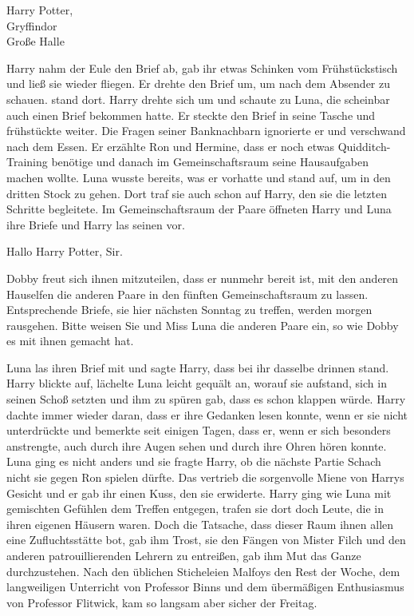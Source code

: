 \begin{brief}
Harry Potter,\\
Gryffindor\\
Große Halle
\end{brief}

Harry nahm der Eule den Brief ab, gab ihr etwas Schinken vom Frühstückstisch und ließ sie wieder fliegen. Er drehte den Brief um, um nach dem Absender zu schauen.  stand dort. Harry drehte sich um und schaute zu Luna, die scheinbar auch einen Brief bekommen hatte. Er steckte den Brief in seine Tasche und frühstückte weiter. Die Fragen seiner Banknachbarn ignorierte er und verschwand nach dem Essen. Er erzählte Ron und Hermine, dass er noch etwas Quidditch-Training benötige und danach im Gemeinschaftsraum seine Hausaufgaben machen wollte. Luna wusste bereits, was er vorhatte und stand auf, um in den dritten Stock zu gehen. Dort traf sie auch schon auf Harry, den sie die letzten Schritte begleitete. Im Gemeinschaftsraum der Paare öffneten Harry und Luna ihre Briefe und Harry las seinen vor.

\begin{brief}
Hallo Harry Potter, Sir.

Dobby freut sich ihnen mitzuteilen, dass er nunmehr bereit ist, mit den anderen Hauselfen die anderen Paare in den fünften Gemeinschaftsraum zu lassen. Entsprechende Briefe, sie hier nächsten Sonntag zu treffen, werden morgen rausgehen. Bitte weisen Sie und Miss Luna die anderen Paare ein, so wie Dobby es mit ihnen gemacht hat.
\end{brief}

Luna las ihren Brief mit und sagte Harry, dass bei ihr dasselbe drinnen stand. Harry blickte auf, lächelte Luna leicht gequält an, worauf sie aufstand, sich in seinen Schoß setzten und ihm zu spüren gab, dass es schon klappen würde. Harry dachte immer wieder daran, dass er ihre Gedanken lesen konnte, wenn er sie nicht unterdrückte und bemerkte seit einigen Tagen, dass er, wenn er sich besonders anstrengte, auch durch ihre Augen sehen und durch ihre Ohren hören konnte. Luna ging es nicht anders und sie fragte Harry, ob die nächste Partie Schach nicht sie gegen Ron spielen dürfte. Das vertrieb die sorgenvolle Miene von Harrys Gesicht und er gab ihr einen Kuss, den sie erwiderte. Harry ging wie Luna  mit gemischten Gefühlen dem Treffen entgegen, trafen sie dort doch Leute, die in ihren eigenen Häusern waren. Doch die Tatsache, dass dieser Raum ihnen allen eine Zufluchtsstätte bot, gab ihm Trost, sie den Fängen von Mister Filch und den anderen patrouillierenden Lehrern zu entreißen, gab ihm Mut das Ganze durchzustehen. Nach den üblichen Sticheleien Malfoys den Rest der Woche, dem langweiligen Unterricht von Professor Binns und dem übermäßigen Enthusiasmus von Professor Flitwick, kam so langsam aber sicher der Freitag.

